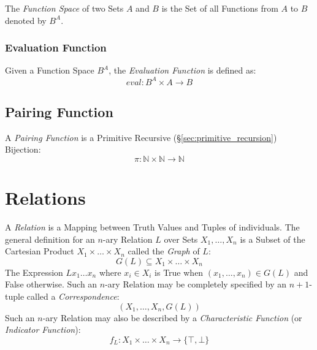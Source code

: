 The \emph{Function Space} of two Sets $A$ and $B$ is the Set of all
Functions from $A$ to $B$ denoted by $B^A$.



\subsubsection{Evaluation Function}\label{sec:evaluation_function}

Given a Function Space $B^A$, the \emph{Evaluation Function} is
defined as:
\[
    eval : B^A \times A \rightarrow B
\]



\subsection{Pairing Function}\label{sec:pairing_function}

A \emph{Pairing Function} is a Primitive Recursive
(\S\ref{sec:primitive_recursion}) Bijection:
\[
    \pi : \mathbb{N} \times \mathbb{N} \rightarrow \mathbb{N}
\]



\section{Relations}\label{sec:set_relations}

A \emph{Relation} is a Mapping between Truth Values and Tuples of
individuals. The general definition for an $n$-ary Relation $L$ over
Sets $X_1, \ldots, X_n$ is a Subset of the Cartesian Product $X_1
\times \ldots \times X_n$ called the \emph{Graph} of $L$:
\[
    G(L) \subseteq X_1 \times \ldots \times X_n
\]
The Expression $L x_1 \ldots x_n$ where $x_i \in X_i$ is True when
$(x_1, \ldots, x_n) \in G(L)$ and False otherwise. Such an $n$-ary
Relation may be completely specified by an $n + 1$-tuple called a
\emph{Correspondence}:
\[
    (X_1, \ldots, X_n, G(L))
\]
Such an $n$-ary Relation may also be described by a
\emph{Characteristic Function} (or \emph{Indicator Function}): %
\[
    f_L : X_1 \times \ldots \times X_n \rightarrow \{\top,\bot\}
\]




